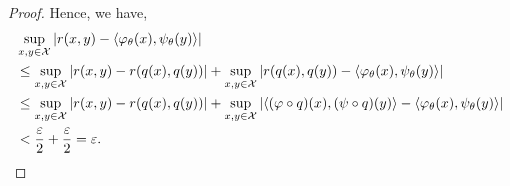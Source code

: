\begin{proof}
Hence, we have,
\begin{equation*}
    \begin{split}
        &\sup_{x, y \in \calX} \abs{r(x, y) - \iprod{\phi_\theta(x)}{\psi_\theta(y)}} \\
        &\leq \sup_{x, y \in \calX} \abs{r(x, y) - r(q(x), q(y))} + \sup_{x, y \in \calX} \abs{r(q(x), q(y)) - \iprod{\phi_\theta(x)}{\psi_\theta(y)}} \\
        &\leq  \sup_{x, y \in \calX} \abs{r(x, y) - r(q(x), q(y))} + \sup_{x, y \in \calX} \abs{\iprod{(\phi \circ q)(x)}{(\psi \circ q)(y)} - \iprod{\phi_\theta(x)}{\psi_\theta(y)}}  \\
        &< \frac{\varepsilon}{2} + \frac{\varepsilon}{2} = \varepsilon.
    \end{split}
\end{equation*}


\end{proof}